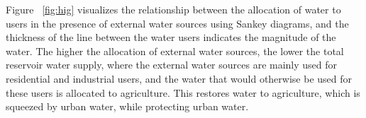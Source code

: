 Figure ~\ref{fig:hig} visualizes the relationship between the allocation of water to users in the presence of external water sources using Sankey diagrams, and the thickness of the line between the water users indicates the magnitude of the water. The higher the allocation of external water sources, the lower the total reservoir water supply, where the external water sources are mainly used for residential and industrial users, and the water that would otherwise be used for these users is allocated to agriculture. This restores water to agriculture, which is squeezed by urban water, while protecting urban water.